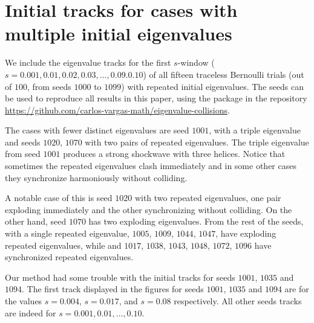 \documentclass{article}
\begin{document}
	\newpage

	\section{Initial tracks for cases with multiple initial eigenvalues} \label{appendix:repeated-eigenvalues}

	We include the eigenvalue tracks for the first 
	$s$-window ($s= 0.001, 0.01, 0.02, 0.03, \dots, 0.09. 0.10$) 
	of all fifteen traceless Bernoulli trials (out of $100$, from seeds $1000$ to $1099$) 
	with repeated initial eigenvalues. The seeds can be used to reproduce all results in this paper, 
	using the package in the repository \url{https://github.com/carlos-vargas-math/eigenvalue-collisions}.

	The cases with fewer distinct eigenvalues are seed $1001$, with a triple eigenvalue 
	and seeds $1020$, $1070$ 
	with two pairs of repeated eigenvalues.
	The triple eigenvalue from seed $1001$ produces a strong shockwave with three helices.
	Notice that sometimes the repeated eigenvalues clash immediately 
	and in some other cases they synchronize harmoniously without colliding. 
	
	A notable case of this is seed $1020$
	with two repeated eigenvalues, 
	one pair exploding immediately and the other synchronizing without colliding. 
	On the other hand, seed $1070$ has two exploding eigenvalues.
	From the rest of the seeds, with a single repeated eigenvalue,
	$1005$, $1009$, $1044$, $1047$, have exploding repeated eigenvalues, 
	while and $1017$, $1038$, $1043$, $1048$, $1072$, $1096$ have synchronized repeated eigenvalues.

	Our method had some trouble with the initial tracks for seeds $1001$, $1035$ and $1094$.
	The first track displayed in the figures for seeds $1001$, $1035$ and $1094$ 
	are for the values $s= 0.004$, $s= 0.017$, and $s=0.08$ respectively. 
	All other seeds tracks are indeed for $s=0.001, 0.01, \dots, 0.10$.
	 
	\newpage
\end{document}
